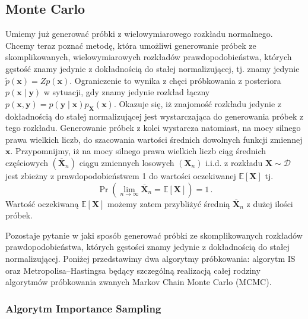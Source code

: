 \documentclass{myclass}
\numberwithin{equation}{subsection}
\begin{document}
\subsection{Monte Carlo}

Umiemy już generować próbki z wielowymiarowego rozkładu normalnego. Chcemy teraz poznać metodę,
która umożliwi generowanie próbek ze skomplikowanych, wielowymiarowych rozkładów prawdopodobieństwa,
których gęstość znamy jedynie z dokładnością do stałej normalizującej, tj. znamy jedynie
\(\tilde{p}(\bm{x}) = Z p(\bm{x})\). Ograniczenie to wynika z chęci próbkowania z posteriora
\(p(\bm{x} \mid \bm{y})\) w sytuacji, gdy znamy jedynie rozkład łączny \(p(\bm{x}, \bm{y}) =
p(\bm{y} \mid \bm{x}) p_{\bm{X}}(\bm{x})\). Okazuje się, iż znajomość rozkładu jedynie z
dokładnością do stałej normalizującej jest wystarczająca do generowania próbek z tego rozkładu.
Generowanie próbek z kolei wystarcza natomiast, na mocy silnego prawa wielkich liczb, do szacowania
wartości średnich dowolnych funkcji zmiennej \(\bm{x}\). Przypomnijmy, iż na mocy silnego prawa
wielkich liczb ciąg średnich częściowych \((\overline{\bm{X}}_n)\) ciągu zmiennych losowych
\((\bm{X}_n)\) i.i.d. z rozkładu \(\bm{X} \sim \mathcal{D}\) jest zbieżny z prawdopodobieństwem 1 do
wartości oczekiwanej \(\mathbb{E}[\bm{X}]\) tj.
\[
\Pr\left(\lim_{n \to \infty} \overline{\bm{X}}_n = \mathbb{E}[\bm{X}]\right) = 1\,.
\]
Wartość oczekiwaną \(\mathbb{E}[\bm{X}]\) możemy zatem przybliżyć średnią \(\overline{\bm{X}}_n\) z
dużej ilości próbek.

Pozostaje pytanie w jaki sposób generować próbki ze skomplikowanych rozkładów prawdopodobieństwa,
których gęstości znamy jedynie z dokładnością do stałej normalizującej. Poniżej przedstawimy dwa
algorytmy próbkowania: algorytm IS oraz Metropolisa--Hastingsa będący szczególną realizacją całej
rodziny algorytmów próbkowania zwanych Markov Chain Monte Carlo (MCMC).


\subsubsection{Algorytm Importance Sampling}
\end{document}
